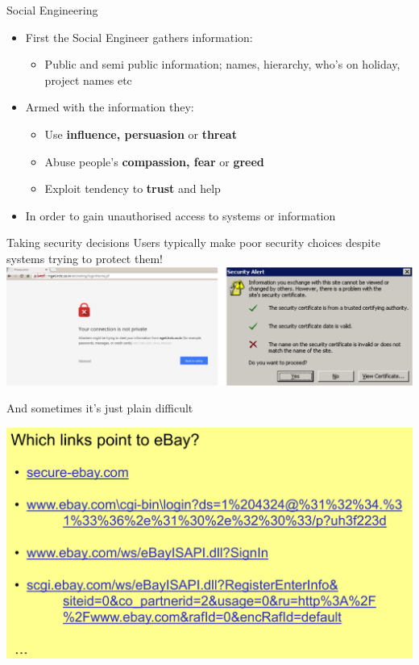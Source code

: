 \documentclass{beamer}
\begin{document}
\begin{frame}{Social Engineering}
  \begin{itemize}
    \item First the Social Engineer gathers information:
    \begin{itemize}
    	\item Public and semi public information; names, hierarchy, who's on holiday, project names etc
    \end{itemize}
    \item Armed with the information they:
     \begin{itemize}
    	\item Use \textbf{influence, persuasion} or \textbf{threat}
        \item Abuse people's \textbf{compassion, fear} or \textbf{greed}
        \item Exploit tendency to \textbf{trust} and help
    \end{itemize}
   	\item In order to gain unauthorised access to systems or information
  \end{itemize}
\end{frame}

\begin{frame}{Taking security decisions}
Users typically make poor security choices despite systems trying to protect them!
\includegraphics[width=1\linewidth]{security-decisions.png}
\end{frame}

\begin{frame}{And sometimes it's just plain difficult}
\begin{center}
\includegraphics[width=0.9\linewidth]{ebay.png}
\end{center}
\end{frame}
\end{document}
